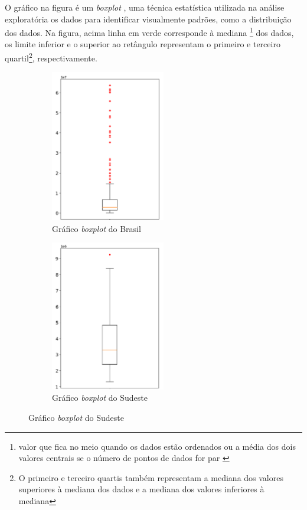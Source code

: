 O gráfico na figura é um \textit{boxplot} \cite{boxplot}, 
uma técnica estatística utilizada na análise exploratória
os dados para identificar visualmente padrões, como a distribuição
dos dados. Na figura, acima linha em verde corresponde à mediana \footnote{
valor que fica no meio quando os dados estão ordenados ou a média
dos dois valores centrais se o número de pontos de dados for par
\cite{boxplot-stat}} 
dos dados, os limite inferior e o superior ao retângulo representam
o primeiro e terceiro quartil\footnote{O primeiro e terceiro 
quartis também representam a mediana dos valores superiores
à mediana dos dados e a mediana dos valores inferiores à mediana}, respectivamente. 

\begin{figure}[H]
    \centering
    \label{fig:boxplot_all}
    \begin{subfigure}{5 cm}
        \centering
        \includegraphics[width=5cm]{../figuras/graficos/boxplot-pib-cc.png}
        \caption{Gráfico \textit{boxplot} do Brasil}
    \end{subfigure}
    \hfill
    \begin{subfigure}{5cm}
        \centering
        \includegraphics[width=5cm]{../figuras/graficos/boxplot-pib-cc-se.png}
        \caption{Gráfico \textit{boxplot} do Sudeste}

\end{subfigure}
\end{figure}
